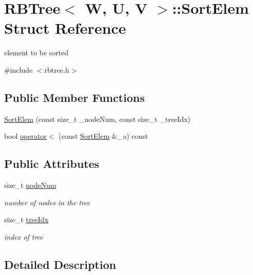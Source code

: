 \hypertarget{structRBTree_1_1SortElem}{\section{R\-B\-Tree$<$ W, U, V $>$\-:\-:Sort\-Elem Struct Reference}
\label{structRBTree_1_1SortElem}
}


element to be sorted  




{\ttfamily \#include $<$rbtree.\-h$>$}

\subsection*{Public Member Functions}
\begin{DoxyCompactItemize}
\item 
\hyperlink{structRBTree_1_1SortElem_acc1a0db3a94e553c619fd82ac6719c8d}{Sort\-Elem} (const size\-\_\-t \-\_\-node\-Num, const size\-\_\-t \-\_\-tree\-Idx)
\item 
bool \hyperlink{structRBTree_1_1SortElem_af3e3d8bd6276b51a16efce64e9a9550d}{operator$<$} (const \hyperlink{structRBTree_1_1SortElem}{Sort\-Elem} \&\-\_\-a) const 
\end{DoxyCompactItemize}
\subsection*{Public Attributes}
\begin{DoxyCompactItemize}
\item 
size\-\_\-t \hyperlink{structRBTree_1_1SortElem_a143eefad3494abf1f6ef9d5a48dd52d7}{node\-Num}
\begin{DoxyCompactList}\small\item\em number of nodes in the tree \end{DoxyCompactList}\item 
size\-\_\-t \hyperlink{structRBTree_1_1SortElem_a9a4b75ae33bc04745caab1b10d6f4e1b}{tree\-Idx}
\begin{DoxyCompactList}\small\item\em index of tree \end{DoxyCompactList}\end{DoxyCompactItemize}


\subsection{Detailed Description}

